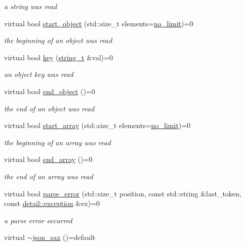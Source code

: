 \begin{DoxyCompactItemize}
\begin{DoxyCompactList}\small\item\em a string was read \end{DoxyCompactList}\item 
virtual bool \hyperlink{structnlohmann_1_1json__sax_a447db60efaabc614492c449e640719cf}{start\+\_\+object} (std\+::size\+\_\+t elements=\hyperlink{structnlohmann_1_1json__sax_a84031c6bbd5b85ec13da024fe9e2b9c9}{no\+\_\+limit})=0
\begin{DoxyCompactList}\small\item\em the beginning of an object was read \end{DoxyCompactList}\item 
virtual bool \hyperlink{structnlohmann_1_1json__sax_a2e0c7ecd80b18d18a8cc76f71cfc2028}{key} (\hyperlink{structnlohmann_1_1json__sax_ae01977a9f3c5b3667b7a2929ed91061e}{string\+\_\+t} \&val)=0
\begin{DoxyCompactList}\small\item\em an object key was read \end{DoxyCompactList}\item 
virtual bool \hyperlink{structnlohmann_1_1json__sax_ad0c722d53ff97be700ccf6a9468bd456}{end\+\_\+object} ()=0
\begin{DoxyCompactList}\small\item\em the end of an object was read \end{DoxyCompactList}\item 
virtual bool \hyperlink{structnlohmann_1_1json__sax_aa7717e96a46e41984260ebabab262369}{start\+\_\+array} (std\+::size\+\_\+t elements=\hyperlink{structnlohmann_1_1json__sax_a84031c6bbd5b85ec13da024fe9e2b9c9}{no\+\_\+limit})=0
\begin{DoxyCompactList}\small\item\em the beginning of an array was read \end{DoxyCompactList}\item 
virtual bool \hyperlink{structnlohmann_1_1json__sax_a235ee975617f28e6a996d1e36a282312}{end\+\_\+array} ()=0
\begin{DoxyCompactList}\small\item\em the end of an array was read \end{DoxyCompactList}\item 
virtual bool \hyperlink{structnlohmann_1_1json__sax_a60287e3bd85f489e04c83f7e3b76e613}{parse\+\_\+error} (std\+::size\+\_\+t position, const std\+::string \&last\+\_\+token, const \hyperlink{classnlohmann_1_1detail_1_1exception}{detail\+::exception} \&ex)=0
\begin{DoxyCompactList}\small\item\em a parse error occurred \end{DoxyCompactList}\item 
virtual \hyperlink{structnlohmann_1_1json__sax_af31bacfa81aa7818d8639d1da65c8eb5}{$\sim$json\+\_\+sax} ()=default
\end{DoxyCompactItemize}
